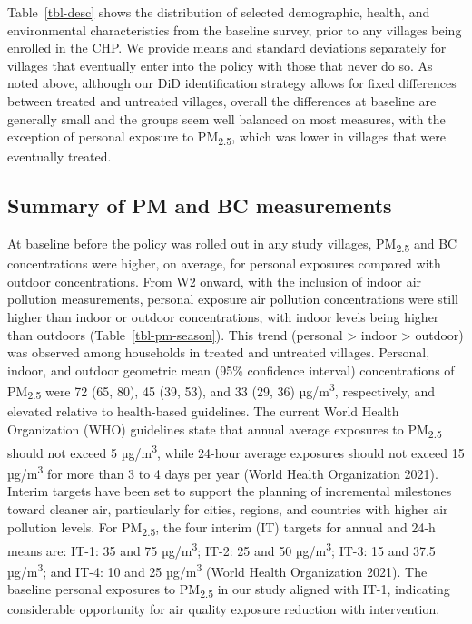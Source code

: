 \documentclass[
  letterpaper,
  DIV=11,
  numbers=noendperiod]{scrartcl}
\begin{document}
Table~\ref{tbl-desc} shows the distribution of selected demographic,
health, and environmental characteristics from the baseline survey,
prior to any villages being enrolled in the CHP. We provide means and
standard deviations separately for villages that eventually enter into
the policy with those that never do so. As noted above, although our DiD
identification strategy allows for fixed differences between treated and
untreated villages, overall the differences at baseline are generally
small and the groups seem well balanced on most measures, with the
exception of personal exposure to PM\textsubscript{2.5}, which was lower
in villages that were eventually treated.

\subsection{Summary of PM and BC
measurements}\label{summary-of-pm-and-bc-measurements}

At baseline before the policy was rolled out in any study villages,
PM\textsubscript{2.5} and BC concentrations were higher, on average, for
personal exposures compared with outdoor concentrations. From W2 onward,
with the inclusion of indoor air pollution measurements, personal
exposure air pollution concentrations were still higher than indoor or
outdoor concentrations, with indoor levels being higher than outdoors
(Table~\ref{tbl-pm-season}). This trend (personal \textgreater{} indoor
\textgreater{} outdoor) was observed among households in treated and
untreated villages. Personal, indoor, and outdoor geometric mean (95\%
confidence interval) concentrations of PM\textsubscript{2.5} were 72
(65, 80), 45 (39, 53), and 33 (29, 36) µg/m\textsuperscript{3},
respectively, and elevated relative to health-based guidelines. The
current World Health Organization (WHO) guidelines state that annual
average exposures to PM\textsubscript{2.5} should not exceed 5
µg/m\textsuperscript{3}, while 24-hour average exposures should not
exceed 15 µg/m\textsuperscript{3} for more than 3 to 4 days per year
(World Health Organization 2021). Interim targets have been set to
support the planning of incremental milestones toward cleaner air,
particularly for cities, regions, and countries with higher air
pollution levels. For PM\textsubscript{2.5}, the four interim (IT)
targets for annual and 24-h means are: IT-1: 35 and 75
µg/m\textsuperscript{3}; IT-2: 25 and 50 µg/m\textsuperscript{3}; IT-3:
15 and 37.5 µg/m\textsuperscript{3}; and IT-4: 10 and 25
µg/m\textsuperscript{3} (World Health Organization 2021). The baseline
personal exposures to PM\textsubscript{2.5} in our study aligned with
IT-1, indicating considerable opportunity for air quality exposure
reduction with intervention.
\end{document}
